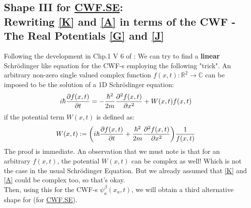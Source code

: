 \documentclass[11pt, a4paper]{article} %
\newcommand{\R}{\mathbb{R}} %
\newcommand{\C}{\mathbb{C}}
\begin{document}
\subsection{Shape III for \hyperref[CWF.SE]{CWF.SE}: \\ Rewriting \ref{K} and \ref{A} in terms of the CWF - The Real Potentials \ref{G} and \ref{J}}
Following the development in Chp.1 V 6 of \cite{JordiXO}: We can try to find a {\bf linear} Schrödinger like equation for the CWF-s employing the following "trick". An arbitrary non-zero single valued complex function $f(x, t):\R^2 \rightarrow \C$ can be imposed to be the solution of a 1D Schrödinger equation:\vspace{-0.3cm}
$$
i \hbar \pdv{f(x,t)}{t} = -\frac{\hbar^2}{2 m}\pdv[2]{f(x,t)}{x} + W(x,t) f(x,t)
$$
if the potential term $W(x, t)$ is defined as:\vspace{-0.3cm}
$$
W(x, t) := \qty(i \hbar \pdv{f(x,t)}{t} +\frac{\hbar^2}{2 m}\pdv[2]{f(x,t)}{x} ) \frac{1}{f(x,t)}\vspace{-0.3cm}
$$
The proof is immediate. An observation that we must note is that for an arbitrary $f(x,t)$, the potential $W(x,t)$ can be complex as well! Which is not the case in the usual Schrödinger Equation. But we already assumed that \ref{K} and \ref{A} could be complex too, so that's okay. \vspace{-0.3cm}\\

Then, using this for the CWF-s $\psi_a^\beta(x_a,t)$, we will obtain a third alternative shape for (for \hyperref[CWF.SE]{CWF.SE}).
\end{document}
